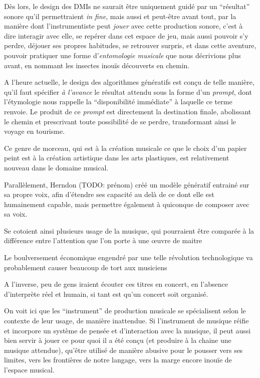 Dès lors, le design des \glspl{DMI} ne saurait être uniquement guidé par un ``résultat'' sonore qu'il permettraient \textit{in fine}, mais aussi et peut-être avant tout, par la manière dont l'instrumentiste peut \textit{jouer} avec cette production sonore, c'est à dire interagir avec elle, se repérer dans cet espace de jeu, mais aussi pouvoir s'y perdre, déjouer ses propres habitudes, se retrouver surpris, et dans cette aventure, pouvoir pratiquer une forme d'\textit{entomologie musicale} que nous décrivions plus avant, en nommant les insectes inouïs découverts en chemin.

A l'heure actuelle, le design des algorithmes génératifs est conçu de telle manière, qu'il faut spécifier \textit{à l'avance} le résultat attendu sous la forme d'un \textit{prompt}, dont l'étymologie nous rappelle la ``disponibilité immédiate'' à laquelle ce terme renvoie. Le produit de ce \textit{prompt} est directement la destination finale, abolissant le chemin et prescrivant toute possibilité de se perdre, transformant ainsi le voyage en tourisme.





Ce genre de morceau, qui est à la création musicale ce que le choix d'un papier peint est à la création artistique dans les arts plastiques, est relativement nouveau dans le domaine musical. 

Parallèlement, Herndon (TODO: prénom) créé un modèle génératif entrainé sur sa propre voix, afin d'étendre ses capacité au delà de ce dont elle est humainement capable, mais permettre également à quiconque de composer avec sa voix.

Se cotoient ainsi plusieurs usage de la musique, qui pourraient être comparée à la différence entre l'attention que l'on porte à une œuvre de maitre 

Le boulversement économique engendré par une telle révolution technologique va probablement causer beaucoup de tort aux musiciens

A l'inverse, peu de gens iraient écouter ces titres en concert, en l'absence d'interprète réel et humain, si tant est qu'un concert soit organisé.

On voit ici que les ``instrument'' de production musicale se spécialisent selon le contexte de leur usage, de manière inattendue.
Si l'instrument de musique réifie et incorpore un système de pensée et d'interaction avec la musique, il peut aussi bien servir à jouer ce pour quoi il a été conçu (et produire à la chaine une musique attendue), qu'être utilisé de manière abusive pour le pousser vers ses limites, vers les frontières de notre langage, vers la marge encore inouïe de l'espace musical.

